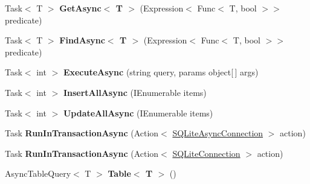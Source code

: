 \begin{DoxyCompactItemize}
\item 
\hypertarget{classSQLite_1_1SQLiteAsyncConnection_ad3e092c3fee0a61611570e8e86dbb88e}{Task$<$ T $>$ {\bfseries Get\-Async$<$ T $>$} (Expression$<$ Func$<$ T, bool $>$$>$ predicate)}\label{classSQLite_1_1SQLiteAsyncConnection_ad3e092c3fee0a61611570e8e86dbb88e}

\item 
\hypertarget{classSQLite_1_1SQLiteAsyncConnection_ab3ee9b32ac49766e4ac20fa697e91f99}{Task$<$ T $>$ {\bfseries Find\-Async$<$ T $>$} (Expression$<$ Func$<$ T, bool $>$$>$ predicate)}\label{classSQLite_1_1SQLiteAsyncConnection_ab3ee9b32ac49766e4ac20fa697e91f99}

\item 
\hypertarget{classSQLite_1_1SQLiteAsyncConnection_aa61f9b65944e23c32cac8b0e2c39d597}{Task$<$ int $>$ {\bfseries Execute\-Async} (string query, params object\mbox{[}$\,$\mbox{]} args)}\label{classSQLite_1_1SQLiteAsyncConnection_aa61f9b65944e23c32cac8b0e2c39d597}

\item 
\hypertarget{classSQLite_1_1SQLiteAsyncConnection_a8caf48d01bf96785143e71ee6a12b6a0}{Task$<$ int $>$ {\bfseries Insert\-All\-Async} (I\-Enumerable items)}\label{classSQLite_1_1SQLiteAsyncConnection_a8caf48d01bf96785143e71ee6a12b6a0}

\item 
\hypertarget{classSQLite_1_1SQLiteAsyncConnection_a42b8f062eb54f8649a2ccff9984b536e}{Task$<$ int $>$ {\bfseries Update\-All\-Async} (I\-Enumerable items)}\label{classSQLite_1_1SQLiteAsyncConnection_a42b8f062eb54f8649a2ccff9984b536e}

\item 
\hypertarget{classSQLite_1_1SQLiteAsyncConnection_affd521039f3a7da49746af600522c809}{Task {\bfseries Run\-In\-Transaction\-Async} (Action$<$ \hyperlink{classSQLite_1_1SQLiteAsyncConnection}{S\-Q\-Lite\-Async\-Connection} $>$ action)}\label{classSQLite_1_1SQLiteAsyncConnection_affd521039f3a7da49746af600522c809}

\item 
\hypertarget{classSQLite_1_1SQLiteAsyncConnection_a0d8abe01ee8f0afe93b6a38423d77029}{Task {\bfseries Run\-In\-Transaction\-Async} (Action$<$ \hyperlink{classSQLite_1_1SQLiteConnection}{S\-Q\-Lite\-Connection} $>$ action)}\label{classSQLite_1_1SQLiteAsyncConnection_a0d8abe01ee8f0afe93b6a38423d77029}

\item 
\hypertarget{classSQLite_1_1SQLiteAsyncConnection_ae222dcdcc5033294c43c9cef1b16fbe1}{Async\-Table\-Query$<$ T $>$ {\bfseries Table$<$ T $>$} ()}\label{classSQLite_1_1SQLiteAsyncConnection_ae222dcdcc5033294c43c9cef1b16fbe1}


\end{DoxyCompactItemize}
